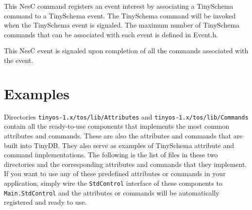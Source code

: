 \documentclass[11pt]{article}
\newcommand{\docroot}{tinyos-1.x}
\begin{document}

This NesC command registers an event interest by associating a TinySchema
command to a TinySchema event.  The TinySchema command will be
invoked when the TinySchema event is signaled.  The maximum number
of TinySchema commands that can be associated with each event is
defined in Event.h.


This NesC event is signaled upon completion of all the commands
associated with the event.

\section{Examples}

Directories {\tt \docroot/tos/lib/Attributes} and 
{\tt \docroot/tos/lib/Commands}
contain all the ready-to-use components that implements
the most common attributes and commands.
These are also the attributes and commands that are built into TinyDB.
They also serve as examples of TinySchema attribute and 
command implementations. 
The following is the list of files in these two directories and the
corresponding attributes and commands that they implement.  If you want to
use any of these predefined attributes or commands in your application,
simply wire the {\tt StdControl} interface of these components to 
{\tt Main.StdControl} and the attributes or commands will be automatically
registered and ready to use.
\end{document}
